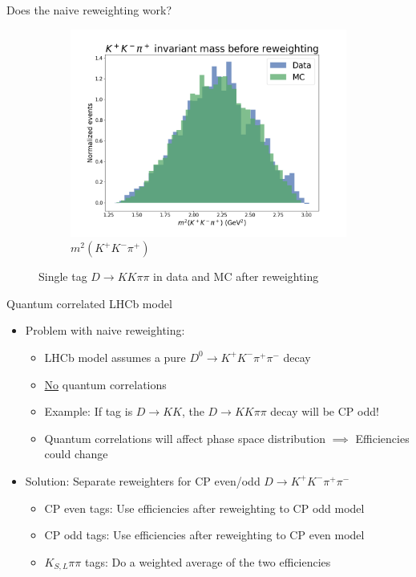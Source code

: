 \documentclass{beamer}
\begin{document}
\begin{frame}{Does the naive reweighting work?}
\begin{figure}
\begin{subfigure}{0.33\textwidth}
      \includegraphics[width = 1.0\textwidth]{Plots/s012_DataMCMismatch_BeforeReweighting.png}
      \caption{$m^2(K^+K^-\pi^+)$}
    \end{subfigure}
    \caption{Single tag $D\to KK\pi\pi$ in data and MC after reweighting}
  \end{figure}
\end{frame}

\begin{frame}{Quantum correlated LHCb model}
  \begin{itemize}
    \setlength\itemsep{1.5em}
    \item{Problem with naive reweighting:}
    \begin{itemize}
    \setlength\itemsep{1.0em}
      \item{LHCb model assumes a pure $D^0\to K^+K^-\pi^+\pi^-$ decay}
      \item{\underline{No} quantum correlations}
      \item{Example: If tag is $D\to KK$, the $D\to KK\pi\pi$ decay will be CP odd!}
      \item{Quantum correlations will affect phase space distribution $\implies$ Efficiencies could change}
    \end{itemize}
    \item{Solution: Separate reweighters for CP even/odd $D\to K^+K^-\pi^+\pi^-$}
    \begin{itemize}
    \setlength\itemsep{1.0em}
      \item{CP even tags: Use efficiencies after reweighting to CP odd model}
      \item{CP odd tags: Use efficiencies after reweighting to CP even model}
      \item{$K_{S, L}\pi\pi$ tags: Do a weighted average of the two efficiencies}
    \end{itemize}
  \end{itemize}
\end{frame}
\end{document}
